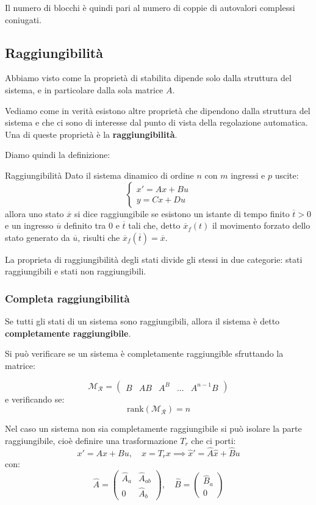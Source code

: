 \documentclass[a4paper,11pt]{article}
\begin{document}
Il numero di blocchi è quindi pari al numero di coppie di autovalori complessi coniugati.

\subsection{Raggiungibilità}
Abbiamo visto come la proprietà di stabilita dipende solo dalla struttura del sistema, e in particolare dalla sola matrice $A$.

Vediamo come in verità esistono altre proprietà che dipendono dalla struttura del sistema e che ci sono di interesse dal punto di vista della regolazione automatica.
Una di queste proprietà è la \textbf{raggiungibilità}.

Diamo quindi la definizione:
\begin{definition}{Raggiungibilità}
	Dato il sistema dinamico di ordine $n$ con $m$ ingressi e $p$ uscite:
	\[
		\begin{cases}
			x' = Ax + Bu \\
			y = Cx + Du
		\end{cases}
	\]
		allora uno stato $\overline{x}$ si dice raggiungibile se esistono un istante di tempo finito $\overline{t} > 0$ e un ingresso $\overline{u}$ definito tra $0$ e $\overline{t}$ tali che, detto $\overline{x}_f(t)$ il movimento forzato dello stato generato da $\overline{u}$, risulti che $\overline{x}_f(\overline{t}) = \overline{x}$.
\end{definition}

La proprieta di raggiungibilità degli stati divide gli stessi in due categorie: stati raggiungibili e stati non raggiungibili.

\subsubsection{Completa raggiungibilità}
Se tutti gli stati di un sistema sono raggiungibili, allora il sistema è detto \textbf{completamente raggiungibile}.

Si può verificare se un sistema è completamente raggiungible sfruttando la matrice:

$$
\mathcal{M}_\mathcal{R} = \begin{pmatrix}
	B & AB & A^B & ... & A^{n - 1}B
\end{pmatrix}
$$
e verificando se:
$$
\mathrm{rank}(\mathcal{M}_\mathcal{R}) = n
$$

Nel caso un sistema non sia completamente raggiungibile si può isolare la parte raggiungibile, cioè definire una trasformazione $T_r$ che ci porti:
$$
x' = Ax + Bu, \quad \hat{x} = T_r x \implies \hat{x}' = \hat{A} \hat{x} + \hat{B} u
$$
con:
$$
\hat{A} = \begin{pmatrix}
\hat{A}_a & \hat{A}_{ab} \\
0 & \hat{A}_b
\end{pmatrix}, \quad
\hat{B} = \begin{pmatrix}
	\hat{B}_a \\
	0
\end{pmatrix}
$$
\end{document}
